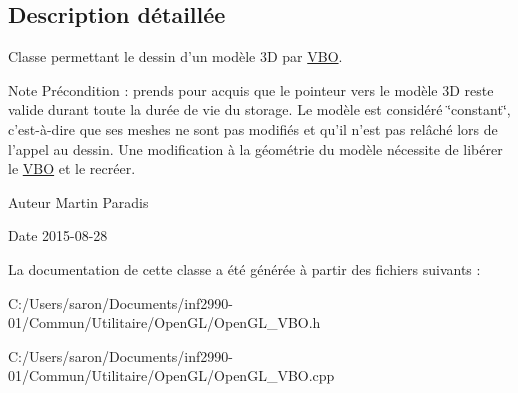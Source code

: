 \subsection{Description détaillée}
Classe permettant le dessin d'un modèle 3\-D par \hyperlink{classopengl_1_1_v_b_o}{V\-B\-O}. 

\begin{DoxyNote}{Note}
Précondition \-: prends pour acquis que le pointeur vers le modèle 3\-D reste valide durant toute la durée de vie du storage. Le modèle est considéré \char`\"{}constant\char`\"{}, c'est-\/à-\/dire que ses meshes ne sont pas modifiés et qu'il n'est pas relâché lors de l'appel au dessin. Une modification à la géométrie du modèle nécessite de libérer le \hyperlink{classopengl_1_1_v_b_o}{V\-B\-O} et le recréer.
\end{DoxyNote}
\begin{DoxyAuthor}{Auteur}
Martin Paradis 
\end{DoxyAuthor}
\begin{DoxyDate}{Date}
2015-\/08-\/28 
\end{DoxyDate}


La documentation de cette classe a été générée à partir des fichiers suivants \-:\begin{DoxyCompactItemize}
\item 
C\-:/\-Users/saron/\-Documents/inf2990-\/01/\-Commun/\-Utilitaire/\-Open\-G\-L/Open\-G\-L\-\_\-\-V\-B\-O.\-h\item 
C\-:/\-Users/saron/\-Documents/inf2990-\/01/\-Commun/\-Utilitaire/\-Open\-G\-L/Open\-G\-L\-\_\-\-V\-B\-O.\-cpp\end{DoxyCompactItemize}
